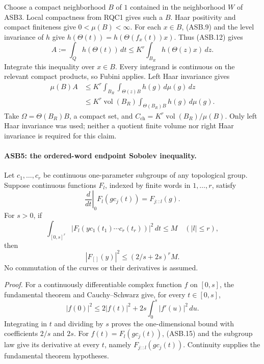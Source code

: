 Choose a compact neighborhood \(B\) of \(1\) contained in the
neighborhood \(W\) of ASB3.  Local compactness from RQC1 gives
such a \(B\).  Haar positivity and compact finiteness give
\(0<\mu(B)<\infty\).
For each \(x\in B\), (ASB.9) and the level invariance of \(h\)
give \(h(\Theta(t))=h(\Theta(f_x(t))x)\).
Thus (ASB.12) gives
\[
       A:=\int_Qh(\Theta(t))\,dt
                  \le K^r\int_{B_R}h(\Theta(z)x)\,dz .
 \tag{ASB.13}
\]
Integrate this inequality over \(x\in B\).
Every integrand is continuous on the relevant compact products,
so Fubini applies.  Left Haar invariance gives
\[
 \begin{split}
 \mu(B)A
 &\le K^r\int_{B_R}\int_{\Theta(z)B}h(g)\,d\mu(g)\,dz\\
 &\le K^r\operatorname{vol}(B_R)
                       \int_{\Theta(B_R)B}h(g)\,d\mu(g).
 \end{split}
 \tag{ASB.14}
\]
Take \(\Omega=\Theta(B_R)B\), a compact set, and
\(C_{\mathrm{ch}}=K^r\operatorname{vol}(B_R)/\mu(B)\).
Only left Haar invariance was used; neither a quotient finite
volume nor right Haar invariance is required for this claim.

\paragraph{ASB5: the ordered-word endpoint Sobolev inequality.}
\label{claim:ASB5}
Let \(c_1,\ldots,c_r\) be continuous one-parameter subgroups of
any topological group.  Suppose continuous functions \(F_l\),
indexed by finite words in \(1,\ldots,r\), satisfy
\[
 \left.\frac{d}{dt}\right|_0F_l(gc_j(t))=F_{j::l}(g).
 \tag{ASB.15}
\]
For \(s>0\), if
\[
 \int_{[0,s]^r}|F_l(yc_1(t_1)\cdots c_r(t_r))|^2\,dt\le M
                   \quad(|l|\le r),
 \tag{ASB.16}
\]
then
\[
               |F_{[]}(y)|^2\le(2/s+2s)^rM.
 \tag{ASB.17}
\]
No commutation of the curves or their derivatives is assumed.

\emph{Proof.}
For a continuously differentiable complex function \(f\) on
\([0,s]\), the fundamental theorem and Cauchy--Schwarz give,
for every \(t\in[0,s]\),
\[
 |f(0)|^2\le2|f(t)|^2+2s\int_0^s|f'(u)|^2\,du.
 \tag{ASB.18}
\]
Integrating in \(t\) and dividing by \(s\) proves the
one-dimensional bound with coefficients \(2/s\) and \(2s\).
For \(f(t)=F_l(gc_j(t))\), (ASB.15) and the subgroup law
give its derivative at every \(t\), namely
\(F_{j::l}(gc_j(t))\).  Continuity supplies the fundamental
theorem hypotheses.

